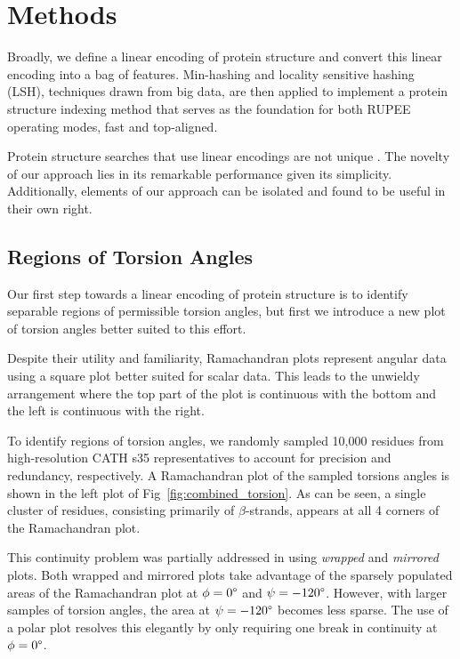 \documentclass[10pt,letterpaper]{article}
\renewcommand{\figurename}{Fig}
\begin{document}
\section*{Methods}

Broadly, we define a linear encoding of protein structure and convert this linear encoding into a bag of features. 
Min-hashing and locality sensitive hashing (LSH), techniques drawn from big data, are then applied to implement a protein structure indexing method that serves as the foundation for both RUPEE operating modes, fast and top-aligned. 

Protein structure searches that use linear encodings are not unique \cite{Carpentier2005,Daniluk2011,Ritchie2012}.
The novelty of our approach lies in its remarkable performance given its simplicity. 
Additionally, elements of our approach can be isolated and found to be useful in their own right. 

\subsection*{Regions of Torsion Angles}

Our first step towards a linear encoding of protein structure is to identify separable regions of permissible torsion angles,
but first we introduce a new plot of torsion angles better suited to this effort. 

Despite their utility and familiarity, Ramachandran plots \cite{Ramachandran1968} represent angular data using a square plot better suited for scalar data.
This leads to the unwieldy arrangement where the top part of the plot is continuous with the bottom and the left is continuous with the right. 

To identify regions of torsion angles, we randomly sampled 10,000 residues from high-resolution CATH s35 representatives to account for precision and redundancy, respectively. 
A Ramachandran plot of the sampled torsions angles is shown in the left plot of \figurename~\ref{fig:combined_torsion}. 
As can be seen, a single cluster of residues, consisting primarily of $\beta$-strands, appears at all 4 corners of the Ramachandran plot.

\begin{figure*}[!h]
\caption{Ramachandran plot (right) and polar plot (left) of randomly sampled torsion angles}
\label{fig:combined_torsion}
\end{figure*}

This continuity problem was partially addressed in \cite{Karplus2010} using \emph{wrapped} and \emph{mirrored} plots. 
Both wrapped and mirrored plots take advantage of the sparsely populated areas of the Ramachandran plot at $\phi = 0\degree$ and $\psi = -120\degree$.
However, with larger samples of torsion angles, the area at $\psi = -120\degree$ becomes less sparse. 
The use of a polar plot resolves this elegantly by only requiring one break in continuity at $\phi = 0\degree$. 
\end{document}
